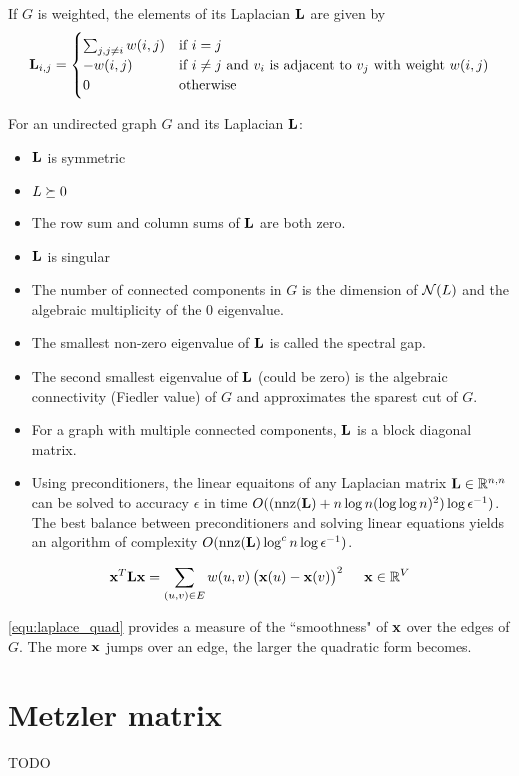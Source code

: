 If $G$ is weighted, the elements of its Laplacian $\mathbf{L}$ are given by
\begin{equation}
\mathbf{L}_{i,j} = \begin{cases}
  \sum_{j,j\ne i} w(i,j) & \textrm{if $i=j$} \\
  -w(i,j)   & \textrm{if $i\ne j$ and $v_i$ is adjacent to $v_j$ with weight $w(i,j)$} \\
   0        & \textrm{otherwise}
\end{cases}
\end{equation}

For an undirected graph $G$ and its Laplacian $\mathbf{L}$:
\begin{itemize}
\item $\mathbf{L}$ is symmetric
\item $L\succeq 0$
\item The row sum and column sums of $\mathbf{L}$ are both zero.
\item $\mathbf{L}$ is singular
\item The number of connected components in $G$ is the dimension of $\mathcal{N}(L)$ and the algebraic multiplicity of the 0 eigenvalue.
\item The smallest non-zero eigenvalue of $\mathbf{L}$ is called the spectral gap.
\item The second smallest eigenvalue of $\mathbf{L}$ (could be zero) is the algebraic connectivity (Fiedler value) of $G$ and approximates the sparest cut of $G$.
\item For a graph with multiple connected components, $\mathbf{L}$ is a block diagonal matrix.
\item Using preconditioners, the linear equaitons of any Laplacian matrix $\mathbf{L}\in\mathbb{R}^{n,n}$ can be solved to accuracy $\epsilon$ in time $O((\operatorname{nnz}(\mathbf{L}) + n\log n (\log \log n)^2) \log \epsilon^{-1})$. The best balance between preconditioners and solving linear equations yields an algorithm of complexity $O(\operatorname{nnz}(\mathbf{L}) \log^c n \log \epsilon^{-1})$.~\citep{Spielman2010}
\end{itemize}

\begin{align}
\mathbf{x}^T \mathbf{L} \mathbf{x} = \sum_{(u,v)\in E} w(u,v) \left(\mathbf{x}(u)-\mathbf{x}(v)\right)^2~~~~\mathbf{x}\in\mathbb{R}^{V} \label{equ:laplace_quad}
\end{align}

\autoref{equ:laplace_quad} provides a measure of the ``smoothness" of $\mathbf{x}$ over the edges of $G$. The more $\mathbf{x}$ jumps over an edge, the larger the quadratic form becomes.


\section{Metzler matrix}
TODO


